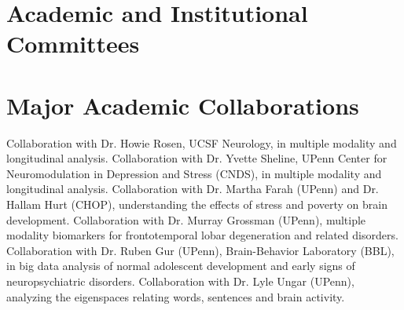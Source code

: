 \documentclass[11pt]{moderncv} %
\begin{document}
\section{Academic and Institutional Committees}


\section{Major Academic Collaborations}
        {Collaboration with Dr. Howie Rosen, UCSF Neurology, in multiple modality and longitudinal analysis.}
        {Collaboration with Dr. Yvette Sheline, UPenn Center for Neuromodulation in Depression and Stress (CNDS), in multiple modality and longitudinal analysis.}
       {Collaboration with Dr. Martha Farah (UPenn) and Dr. Hallam Hurt (CHOP), understanding the effects of stress and poverty on brain development.}
       {Collaboration with Dr. Murray Grossman (UPenn),  multiple modality biomarkers for frontotemporal lobar degeneration and related disorders.}
       {Collaboration with Dr. Ruben Gur (UPenn), Brain-Behavior Laboratory (BBL), in big data analysis of normal adolescent development and early signs of neuropsychiatric disorders.}
       {Collaboration with Dr. Lyle Ungar (UPenn), analyzing the eigenspaces relating words, sentences and brain activity.}
\end{document}
